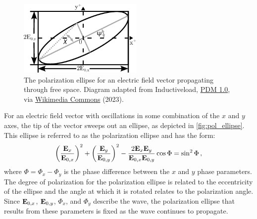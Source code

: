 \begin{figure}[t]
    \centering
    \includegraphics[width=6cm]{figures/2_pol_ellipse.pdf}
    \caption{The polarization ellipse for an electric field vector propagating through free space. Diagram adapted from Inductiveload, \protect\href{https://creativecommons.org/publicdomain/mark/1.0/}{PDM 1.0}, via \protect\href{https://commons.wikimedia.org/wiki/File:Polarisation_ellipse2.svg}{Wikimedia Commons} (2023).}
    \label{fig:pol_ellipse}
\end{figure}

For an electric field vector with oscillations in some combination of the $x$ and $y$ axes, the tip of the vector sweeps out an ellipse, as depicted in \autoref{fig:pol_ellipse}. This ellipse is referred to as the polarization ellipse and has the form:
\begin{equation}
    \left( \frac{\mathbf{E}_{x}}{\mathbf{E}_{0, x}}\right)^{2} +
    \left( \frac{\mathbf{E}_{y}}{\mathbf{E}_{0, y}}\right)^{2} -
    \frac{2 \mathbf{E}_{x} \mathbf{E}_{y}}{\mathbf{E}_{0, x} \mathbf{E}_{0, y}} \cos\Phi =
    \sin^{2} \Phi\,,\label{eq:pol_ellipse}
\end{equation}
where $\Phi = \Phi_{x} - \Phi_{y}$ is the phase difference between the $x$ and $y$ phase parameters. The degree of polarization for the polarization ellipse is related to the eccentricity of the ellipse and the angle at which it is rotated relates to the polarization angle. Since $\mathbf{E}_{0, x}$, $\mathbf{E}_{0, y}$, $\Phi_{x}$, and $\Phi_{y}$ describe the wave, the polarization ellipse that results from these parameters is fixed as the wave continues to propagate.

